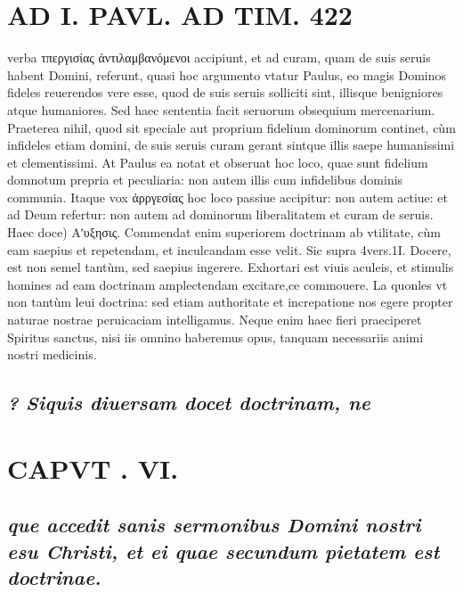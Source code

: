 \documentclass{article}
\begin{document}
\begin{pages}
\section*{AD I. PAVL. AD TIM. 422 }
\marginpar{[ p.]}\pstart verba τπεργισίας ἀντιλαμβανόμενοι accipiunt, et ad curam, quam de suis seruis habent Domini, referunt, quasi hoc argumento vtatur Paulus, eo magis Dominos fideles reuerendos vere esse, quod de suis seruis solliciti sint, illisque benigniores atque humaniores. Sed haec sententia facit seruorum obsequium mercenarium. Praeterea nihil, quod sit speciale aut proprium fidelium dominorum continet, cùm infideles etiam domini, de suis seruis curam gerant sintque illis saepe humanissimi et clementissimi. At Paulus ea notat et obseruat hoc loco, quae sunt fidelium domnotum prepria et peculiaria: non autem illis cum infidelibus dominis communia. Itaque vox ἀρργεσίας hoc loco passiue accipitur: non autem actiue: et ad Deum refertur: non autem ad dominorum liberalitatem et curam de seruis.  \pend\pstart Haec doce) Αʹυξησις. Commendat enim superiorem doctrinam ab vtilitate, cùm eam saepius et repetendam, et inculcandam esse velit. Sic supra 4vers.1I.  \pend\pstart Docere, est non semel tantùm, sed saepius ingerere. Exhortari est viuis aculeis, et stimulis homines ad eam doctrinam amplectendam excitare,ce commouere. La quonles vt non tantùm leui doctrina: sed etiam authoritate et increpatione nos egere propter naturae nostrae peruicaciam intelligamus. Neque enim haec fieri praeciperet Spiritus sanctus, nisi iis omnino haberemus opus, tanquam necessariis animi nostri medicinis.  \pend
{}
{}
\subsection*{\textit{? Siquis diuersam docet doctrinam, ne}}
\section*{CAPVT . VI. }
\marginpar{[ p.423 ]}
{}
\subsection*{\textit{que accedit sanis sermonibus Domini nostri esu Christi, et ei quae secundum pietatem est doctrinae. }}
{}

\end{pages}
\end{document}
